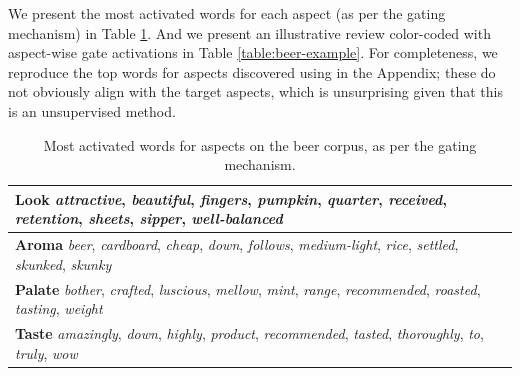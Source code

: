 \documentclass[11pt,a4paper]{article}
\begin{document}
We present the most activated words for each aspect (as per the gating mechanism) in Table \ref{table:Beermost}. And we present an illustrative review color-coded with aspect-wise gate activations in Table \ref{table:beer-example}. For completeness, we reproduce the top words for aspects discovered using  in the Appendix; these do not obviously align with the target aspects, which is unsurprising given that this is an unsupervised method.

\begin{table}%
\vspace{-.5em}
\footnotesize
\centering
\begin{tabularx}{\columnwidth}{X} 
{\bf Look} \emph{attractive}, \emph{beautiful}, \emph{fingers}, \emph{pumpkin}, \emph{quarter}, \emph{received}, \emph{retention}, \emph{sheets}, \emph{sipper}, \emph{well-balanced} \\\hline 
{\bf Aroma} \emph{beer}, \emph{cardboard}, \emph{cheap}, \emph{down}, \emph{follows}, \emph{medium-light}, \emph{rice}, \emph{settled}, \emph{skunked}, \emph{skunky} \\\hline 
{\bf Palate} \emph{bother}, \emph{crafted}, \emph{luscious}, \emph{mellow}, \emph{mint}, \emph{range}, \emph{recommended}, \emph{roasted}, \emph{tasting}, \emph{weight} \\\hline 
{\bf Taste} \emph{amazingly}, \emph{down}, \emph{highly}, \emph{product}, \emph{recommended}, \emph{tasted}, \emph{thoroughly}, \emph{to}, \emph{truly}, \emph{wow} \\
\end{tabularx}
\vspace{-1em}
\caption{Most activated words for aspects on the beer corpus, as per the gating mechanism.}
\label{table:Beermost}
\vspace{-1em}
\end{table}
\end{document}
